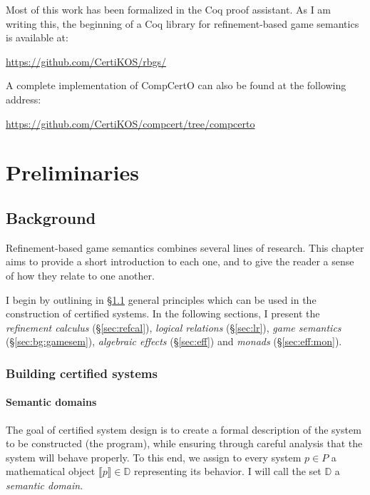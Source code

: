 \documentclass[11pt,oneside]{book}
\theoremstyle{definition}
\begin{document}
Most of this work has been formalized in the Coq proof assistant.
As I am writing this,
the beginning of a Coq library
for refinement-based game semantics
is available at:
\begin{center}
  \url{https://github.com/CertiKOS/rbgs/}
\end{center}
A complete implementation of CompCertO
can also be found at the following address:
\begin{center}
  \url{https://github.com/CertiKOS/compcert/tree/compcerto}
\end{center}




\part{Preliminaries} \label{part:prelim}

\chapter{Background} %

Refinement-based game semantics combines
several lines of research.
This chapter aims to provide a short introduction to each one,
and to give the reader a sense of how they relate to one another.

I begin
by outlining in \S\ref{sec:principles} general principles
which can be used in the construction of certified systems.
In the following sections,
I present
the \emph{refinement calculus} (\S\ref{sec:refcal}),
\emph{logical relations} (\S\ref{sec:lr}),
\emph{game semantics} (\S\ref{sec:bg:gamesem}),
\emph{algebraic effects} (\S\ref{sec:eff}) and
\emph{monads} (\S\ref{sec:eff:mon}).

\section{Building certified systems} \label{sec:principles} %

\subsection{Semantic domains} %

The goal of certified system design is
to create a formal description of
the system to be constructed (the program),
while ensuring
through careful analysis
that the system
will behave properly.
To this end,
we assign
to every system $p \in P$
a mathematical object $\llbracket p \rrbracket \in \mathbb{D}$
representing its behavior.
I will call the set $\mathbb{D}$ a \emph{semantic domain}.
\end{document}
